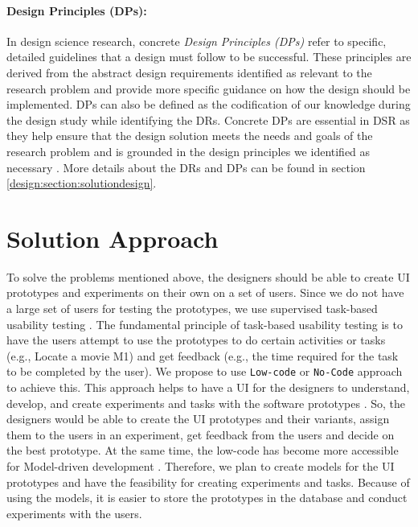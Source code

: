 \paragraph*{Design Principles (DPs):}
In design science research, concrete \textit{Design Principles (DPs)} refer to specific, detailed guidelines that a design must follow to be successful. 
These principles are derived from the abstract design requirements identified as relevant to the research problem and provide more specific guidance on how the design should be implemented.
DPs can also be defined as the codification of our knowledge during the design study while identifying the DRs. 
Concrete DPs are essential in DSR as they help ensure that the design solution meets the needs and goals of the research problem and is grounded in the design principles we identified as necessary \cite{misc:dsr:webster}.
More details about the DRs and DPs can be found in section \ref{design:section:solutiondesign}.
\section{Solution Approach}
\label{introduction:section:solution}

To solve the problems mentioned above, the designers should be able to create UI prototypes and experiments on their own on a set of users.
Since we do not have a large set of users for testing the prototypes, we use supervised task-based usability testing \cite{article:dataanalysis:supervisedtest}.
The fundamental principle of task-based usability testing is to have the users attempt to use the prototypes to do certain activities or tasks (e.g., Locate a movie M1) and get feedback (e.g., the time required for the task to be completed by the user).
We propose to use \texttt{Low-code} or \texttt{No-Code} approach to achieve this.
This approach helps to have a UI for the designers to understand, develop, and create experiments and tasks with the software prototypes \cite{paper:lowcode:khorram}.
So, the designers would be able to create the UI prototypes and their variants, assign them to the users in an experiment, get feedback from the users and decide on the best prototype.
At the same time, the low-code has become more accessible for Model-driven development \cite{article:lowcode:modeldriven}.
Therefore, we plan to create models for the UI prototypes and have the feasibility for creating experiments and tasks. 
Because of using the models, it is easier to store the prototypes in the database and conduct experiments with the users. 

